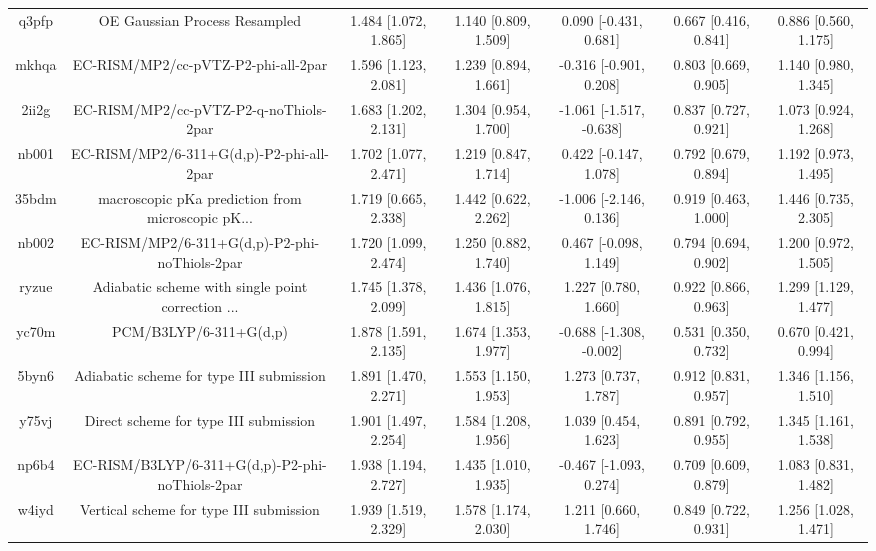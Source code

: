 \documentclass{article}
\begin{document}
\begin{center}
\begin{longtable}{|ccccccc|}
 q3pfp &                      OE Gaussian Process Resampled &  1.484 [1.072, 1.865] &  1.140 [0.809, 1.509] &    0.090 [-0.431, 0.681] &  0.667 [0.416, 0.841] &   0.886 [0.560, 1.175] \\
 mkhqa &                EC-RISM/MP2/cc-pVTZ-P2-phi-all-2par &  1.596 [1.123, 2.081] &  1.239 [0.894, 1.661] &   -0.316 [-0.901, 0.208] &  0.803 [0.669, 0.905] &   1.140 [0.980, 1.345] \\
 2ii2g &             EC-RISM/MP2/cc-pVTZ-P2-q-noThiols-2par &  1.683 [1.202, 2.131] &  1.304 [0.954, 1.700] &  -1.061 [-1.517, -0.638] &  0.837 [0.727, 0.921] &   1.073 [0.924, 1.268] \\
 nb001 &           EC-RISM/MP2/6-311+G(d,p)-P2-phi-all-2par &  1.702 [1.077, 2.471] &  1.219 [0.847, 1.714] &    0.422 [-0.147, 1.078] &  0.792 [0.679, 0.894] &   1.192 [0.973, 1.495] \\
 35bdm &  macroscopic pKa prediction from microscopic pK... &  1.719 [0.665, 2.338] &  1.442 [0.622, 2.262] &   -1.006 [-2.146, 0.136] &  0.919 [0.463, 1.000] &   1.446 [0.735, 2.305] \\
 nb002 &      EC-RISM/MP2/6-311+G(d,p)-P2-phi-noThiols-2par &  1.720 [1.099, 2.474] &  1.250 [0.882, 1.740] &    0.467 [-0.098, 1.149] &  0.794 [0.694, 0.902] &   1.200 [0.972, 1.505] \\
 ryzue &  Adiabatic scheme with single point correction ... &  1.745 [1.378, 2.099] &  1.436 [1.076, 1.815] &     1.227 [0.780, 1.660] &  0.922 [0.866, 0.963] &   1.299 [1.129, 1.477] \\
 yc70m &                             PCM/B3LYP/6-311+G(d,p) &  1.878 [1.591, 2.135] &  1.674 [1.353, 1.977] &  -0.688 [-1.308, -0.002] &  0.531 [0.350, 0.732] &   0.670 [0.421, 0.994] \\
 5byn6 &           Adiabatic scheme for type III submission &  1.891 [1.470, 2.271] &  1.553 [1.150, 1.953] &     1.273 [0.737, 1.787] &  0.912 [0.831, 0.957] &   1.346 [1.156, 1.510] \\
 y75vj &              Direct scheme for type III submission &  1.901 [1.497, 2.254] &  1.584 [1.208, 1.956] &     1.039 [0.454, 1.623] &  0.891 [0.792, 0.955] &   1.345 [1.161, 1.538] \\
 np6b4 &    EC-RISM/B3LYP/6-311+G(d,p)-P2-phi-noThiols-2par &  1.938 [1.194, 2.727] &  1.435 [1.010, 1.935] &   -0.467 [-1.093, 0.274] &  0.709 [0.609, 0.879] &   1.083 [0.831, 1.482] \\
 w4iyd &            Vertical scheme for type III submission &  1.939 [1.519, 2.329] &  1.578 [1.174, 2.030] &     1.211 [0.660, 1.746] &  0.849 [0.722, 0.931] &   1.256 [1.028, 1.471] \\

\end{longtable}
\end{center}
\end{document}
